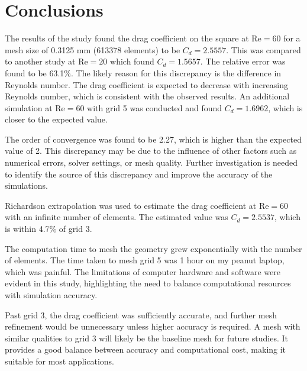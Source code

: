 \section{Conclusions}
The results of the study found the drag coefficient on the square at Re$=60$ for a mesh size of 0.3125 mm (613378 elements) to be $C_d = 2.5557$. This was compared to another study at Re$=20$ which found $C_d = 1.5657$. The relative error was found to be 63.1\%. The likely reason for this discrepancy is the difference in Reynolds number. The drag coefficient is expected to decrease with increasing Reynolds number, which is consistent with the observed results. An additional simulation at Re$=60$ with grid 5 was conducted and found $C_d = 1.6962$, which is closer to the expected value. 

The order of convergence was found to be 2.27, which is higher than the expected value of 2. This discrepancy may be due to the influence of other factors such as numerical errors, solver settings, or mesh quality. Further investigation is needed to identify the source of this discrepancy and improve the accuracy of the simulations.

Richardson extrapolation was used to estimate the drag coefficient at Re$=60$ with an infinite number of elements. The estimated value was $C_d = 2.5537$, which is within 4.7\% of grid 3. 

The computation time to mesh the geometry grew exponentially with the number of elements. The time taken to mesh grid 5 was 1 hour on my peanut laptop, which was painful. The limitations of computer hardware and software were evident in this study, highlighting the need to balance computational resources with simulation accuracy.

Past grid 3, the drag coefficient was sufficiently accurate, and further mesh refinement would be unnecessary unless higher accuracy is required. A mesh with similar qualities to grid 3 will likely be the baseline mesh for future studies. It provides a good balance between accuracy and computational cost, making it suitable for most applications.